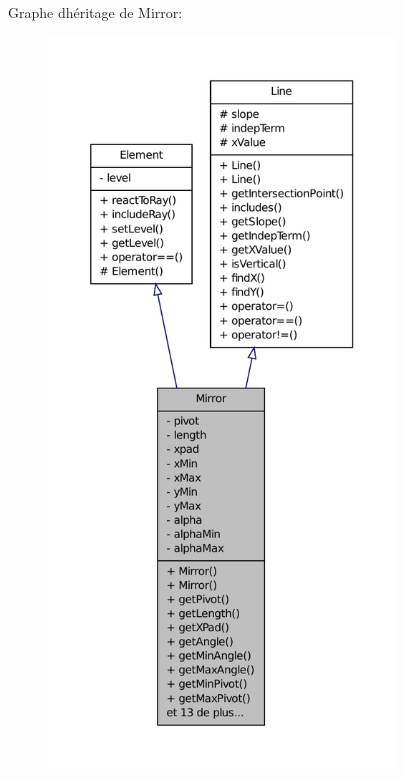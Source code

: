 Graphe d\textquotesingle{}héritage de Mirror\+:\nopagebreak
\begin{figure}[H]
\begin{center}
\leavevmode
\includegraphics[height=550pt]{d8/d7d/classMirror__inherit__graph}
\end{center}
\end{figure}



